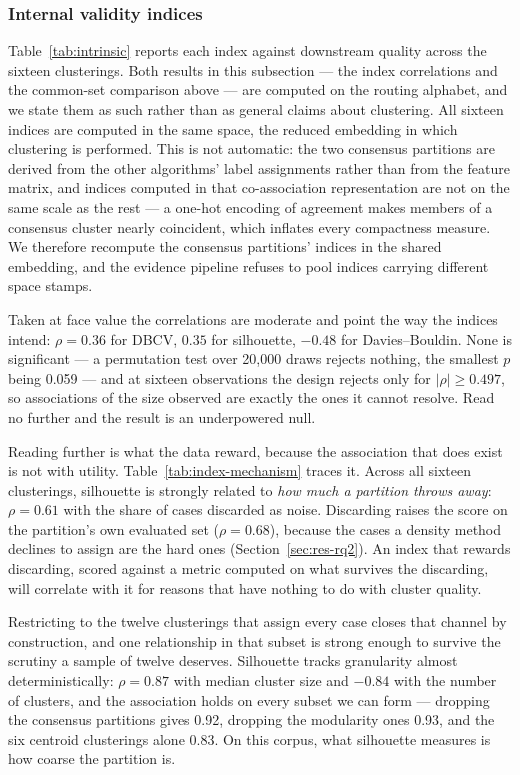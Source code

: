 

\subsubsection{Internal validity indices}

Table~\ref{tab:intrinsic} reports each index against downstream quality across the sixteen
clusterings. Both results in this subsection --- the index correlations and the common-set
comparison above --- are computed on the routing alphabet, and we state them as such rather than
as general claims about clustering. All sixteen indices are computed in the same space, the
reduced embedding in which clustering is performed. This is not automatic: the two consensus
partitions are derived from the other algorithms' label assignments rather than from the feature
matrix, and indices computed in that co-association representation are not on the same scale as
the rest --- a one-hot encoding of agreement makes members of a consensus cluster nearly
coincident, which inflates every compactness measure. We therefore recompute the consensus
partitions' indices in the shared embedding, and the evidence pipeline refuses to pool indices
carrying different space stamps.

Taken at face value the correlations are moderate and point the way the indices intend:
$\rho = 0.36$ for DBCV, $0.35$ for silhouette, $-0.48$ for Davies--Bouldin. None is significant
--- a permutation test over 20{,}000 draws rejects nothing, the smallest $p$ being 0.059 --- and
at sixteen observations the design rejects only for $|\rho| \geq 0.497$, so associations of the
size observed are exactly the ones it cannot resolve. Read no further and the result is an
underpowered null.

Reading further is what the data reward, because the association that does exist is not with
utility. Table~\ref{tab:index-mechanism} traces it. Across all sixteen clusterings, silhouette
is strongly related to \emph{how much a partition throws away}: $\rho = 0.61$ with the share of
cases discarded as noise. Discarding raises the score on the partition's own evaluated set
($\rho = 0.68$), because the cases a density method declines to assign are the hard ones
(Section~\ref{sec:res-rq2}). An index that rewards discarding, scored against a metric computed
on what survives the discarding, will correlate with it for reasons that have nothing to do with
cluster quality.

Restricting to the twelve clusterings that assign every case closes that channel by
construction, and one relationship in that subset is strong enough to survive the scrutiny a
sample of twelve deserves. Silhouette tracks granularity almost deterministically:
$\rho = 0.87$ with median cluster size and $-0.84$ with the number of clusters, and the
association holds on every subset we can form --- dropping the consensus partitions gives 0.92,
dropping the modularity ones 0.93, and the six centroid clusterings alone 0.83. On this corpus,
what silhouette measures is how coarse the partition is.

